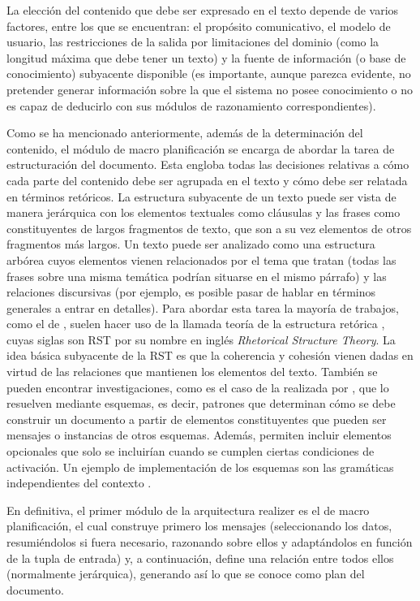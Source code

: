 La elección del contenido que debe ser expresado en el texto depende de varios factores, entre los que se encuentran: el propósito comunicativo, el modelo de usuario, las restricciones de la salida por limitaciones del dominio (como la longitud máxima que debe tener un texto) y la fuente de información (o base de conocimiento) subyacente disponible (es importante, aunque parezca evidente, no pretender generar información sobre la que el sistema no posee conocimiento o no es capaz de deducirlo con sus módulos de razonamiento correspondientes).

Como se ha mencionado anteriormente, además de la determinación del contenido, el módulo de macro planificación se encarga de abordar la tarea de estructuración del documento. Esta engloba todas las decisiones relativas a cómo cada parte del contenido debe ser agrupada en el texto y cómo debe ser relatada en términos retóricos. La estructura subyacente de un texto puede ser vista de manera jerárquica con los elementos textuales como cláusulas y las frases como constituyentes de largos fragmentos de texto, que son a su vez elementos de otros fragmentos más largos. Un texto puede ser analizado como una estructura arbórea cuyos elementos vienen relacionados por el tema que tratan (todas las frases sobre una misma temática podrían situarse en el mismo párrafo) y las relaciones discursivas (por ejemplo, es posible pasar de hablar en términos generales a entrar en detalles). Para abordar esta tarea la mayoría de trabajos, como el de \cite{williams2008generating}, suelen hacer uso de la llamada teoría de la estructura retórica \citep{mann1987rhetorical}, cuyas siglas son RST por su nombre en inglés \textit{Rhetorical Structure Theory}. La idea básica subyacente de la RST es que la coherencia y cohesión vienen dadas en virtud de las relaciones que mantienen los elementos del texto. También se pueden encontrar investigaciones, como es el caso de la realizada por \cite{mckeown1992text}, que lo resuelven mediante esquemas, es decir, patrones que determinan cómo se debe construir un documento a partir de elementos constituyentes que pueden ser mensajes o instancias de otros esquemas. Además, permiten incluir elementos opcionales que solo se incluirían cuando se cumplen ciertas condiciones de activación. Un ejemplo de implementación de los esquemas son las gramáticas independientes del contexto \citep{cremers1975context}.

En definitiva, el primer módulo de la arquitectura realizer es el de macro planificación, el cual construye primero los mensajes (seleccionando los datos, resumiéndolos si fuera necesario, razonando sobre ellos y adaptándolos en función de la tupla de entrada) y, a continuación, define una relación entre todos ellos (normalmente jerárquica), generando así lo que se conoce como plan del documento.

